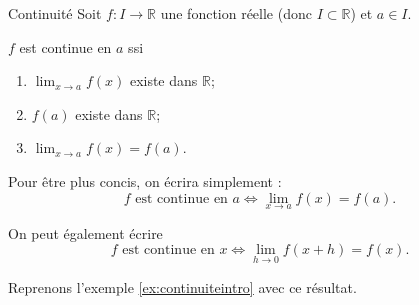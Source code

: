 \documentclass[a4paper,12pt]{article}
\begin{document}
\begin{thm}
Continuité
	\tcblower
Soit $f : I \to \mathbb{R}$ une fonction réelle (donc $I \subset \mathbb{R}$) et $a \in I$.  
\medskip

\begin{minipage}[c][0.8cm]{0.5\textwidth}{
		\begin{center}
$f$ est continue en $a$ ssi  
\end{center}
}
\end{minipage}
\hfill
\begin{minipage}[c]{0.5\textwidth}{
\vspace{0pt}
\begin{enumerate}
\item $\displaystyle\lim_{x\to a}f(x)$ existe dans $\mathbb{R}$;
\item $f(a)$  existe dans $\mathbb{R}$;
\item $\displaystyle\lim_{x\to a}f(x)=f(a)$.
\end{enumerate}
}
\end{minipage}
\medskip

Pour être plus concis, on écrira simplement :  
\[f \text{ est continue en }a \Longleftrightarrow \displaystyle\lim_{x\to a}f(x)=f(a).\]
\end{thm}
\begin{remarque}
	\tcblower
	On peut également écrire
	\[f \text{ est continue en }x \Longleftrightarrow \displaystyle\lim_{h\to 0}f(x+h)=f(x).\]
\end{remarque}
Reprenons l'exemple \ref{ex:continuiteintro} avec ce résultat.
\end{document}
